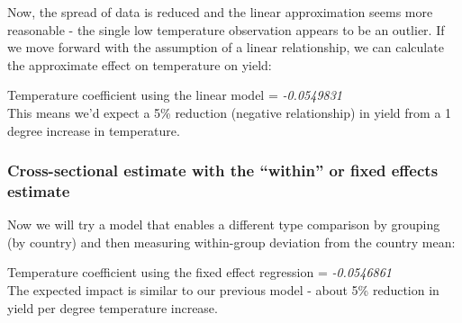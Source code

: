 \documentclass[
]{article}
\newenvironment{Shaded}{\begin{snugshade}}{\end{snugshade}}
\newcommand{\AttributeTok}[1]{\textcolor[rgb]{0.77,0.63,0.00}{#1}}
\newcommand{\CommentTok}[1]{\textcolor[rgb]{0.56,0.35,0.01}{\textit{#1}}}
\newcommand{\DecValTok}[1]{\textcolor[rgb]{0.00,0.00,0.81}{#1}}
\newcommand{\FunctionTok}[1]{\textcolor[rgb]{0.00,0.00,0.00}{#1}}
\newcommand{\NormalTok}[1]{#1}
\newcommand{\OtherTok}[1]{\textcolor[rgb]{0.56,0.35,0.01}{#1}}
\newcommand{\SpecialCharTok}[1]{\textcolor[rgb]{0.00,0.00,0.00}{#1}}
\newcommand{\StringTok}[1]{\textcolor[rgb]{0.31,0.60,0.02}{#1}}
\begin{document}
Now, the spread of data is reduced and the linear approximation seems
more reasonable - the single low temperature observation appears to be
an outlier. If we move forward with the assumption of a linear
relationship, we can calculate the approximate effect on temperature on
yield:

\begin{Shaded}
\end{Shaded}

Temperature coefficient using the linear model = \emph{-0.0549831}\\
This means we'd expect a 5\% reduction (negative relationship) in yield
from a 1 degree increase in temperature.

\hypertarget{cross-sectional-estimate-with-the-within-or-fixed-effects-estimate}{%
\subsubsection{Cross-sectional estimate with the ``within'' or fixed
effects
estimate}\label{cross-sectional-estimate-with-the-within-or-fixed-effects-estimate}}

Now we will try a model that enables a different type comparison by
grouping (by country) and then measuring within-group deviation from the
country mean:

\begin{Shaded}
\end{Shaded}

Temperature coefficient using the fixed effect regression =
\emph{-0.0546861}\\
The expected impact is similar to our previous model - about 5\%
reduction in yield per degree temperature increase.
\end{document}
